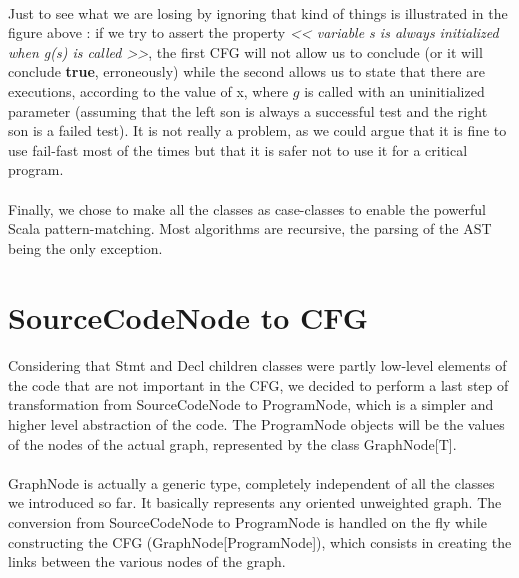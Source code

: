 \documentclass{report}
\begin{document}
\paragraph{}
\hspace{4mm}\textnormal{Just to see what we are losing by ignoring that kind of things is illustrated in the figure above : if we try to
assert the property \textit {<< variable s is always initialized when g(s) is called >>}, the first CFG will not allow us to conclude
(or it will conclude \textbf {true}, erroneously) while the second allows us
to state that there are executions, according to the value of x,
where $g$ is called with an uninitialized parameter
(assuming that the left son is always a successful test and the right son is a failed test). It is not really a problem, as
we could argue that it is fine to use fail-fast most of the times but that it is safer not to use it for a critical program.}

\paragraph{}
\hspace{4mm}\textnormal{Finally, we chose to make all the classes as case-classes to enable the powerful Scala pattern-matching.
Most algorithms are recursive, the parsing of the AST being the only exception.}

\section{SourceCodeNode to CFG}

\paragraph{}
\hspace{4mm}\textnormal{Considering that Stmt and Decl children classes were partly low-level elements of the code that are not important
in the CFG, we decided to perform a last step of transformation from SourceCodeNode to ProgramNode, which is a simpler and higher level abstraction of the code.
The ProgramNode objects will be the values of the nodes of the actual graph, represented by the class GraphNode[T].}

\paragraph{}
\hspace{4mm}\textnormal{GraphNode is actually a generic type, completely independent of all the classes we introduced so far.
It basically represents any oriented unweighted graph. The conversion from SourceCodeNode to
ProgramNode is handled on the fly while constructing the CFG (GraphNode[ProgramNode]), which
consists in creating the links between the various nodes of the graph.}
\end{document}
